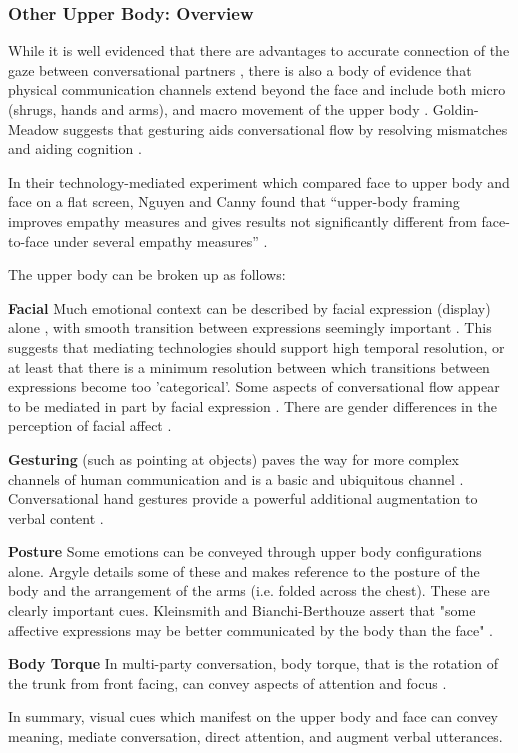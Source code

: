 \subsubsection{Other Upper Body: Overview}
While it is well evidenced that there are advantages to accurate connection of the gaze between conversational partners \cite{Argyle1969, Kleinke1986}, there is also a body of evidence that physical communication channels extend beyond the face \cite{Kleinke1986, Nguyen2009} and include both micro (shrugs, hands and arms), and macro movement of the upper body \cite{Ekman1993}. Goldin-Meadow suggests that gesturing aids conversational flow by resolving mismatches and aiding cognition \cite{Goldin-Meadow1999}.\par
                    In their technology-mediated experiment which compared face to upper body and face on a flat screen, Nguyen and Canny found that ``upper-body framing improves empathy measures and gives results not significantly different from face-to-face under several empathy measures'' \cite{Nguyen2009}. 
                    
The upper body can be broken up as follows:\par
\textbf{Facial} Much emotional context can be described by facial expression (display) alone \cite{Ekman1993, Chovil1991}, with smooth transition between expressions seemingly important \cite{schiano2004categorical}. This suggests that mediating technologies should support high temporal resolution, or at least that there is a minimum resolution between which transitions between expressions become too 'categorical'. Some aspects of conversational flow appear to be mediated in part by facial expression \cite{ohba1998facial}. There are gender differences in the perception of facial affect \cite{Hofmann20061683}.\par
\textbf{Gesturing} (such as pointing at objects) paves the way for more complex channels of human communication and is a basic and ubiquitous channel \cite{Iverson2005}.  Conversational hand gestures provide a powerful additional augmentation to verbal content \cite{Krauss1996}.\par
\textbf{Posture} Some emotions can be conveyed through upper body configurations alone. Argyle details some of these \cite{Argyle1988} and makes reference to the posture of the body and the arrangement of the arms (i.e. folded across the chest). These are clearly important cues. Kleinsmith and Bianchi-Berthouze assert that "some affective expressions may be better communicated by the body than the face" \cite{Kleinsmith2013}.\par
\textbf{Body Torque} In multi-party conversation, body torque, that is the rotation of the trunk from front facing, can convey aspects of attention and focus \cite{10.2307/40971262}.\par
In summary, visual cues which manifest on the upper body and face can convey meaning, mediate conversation, direct attention, and augment verbal utterances. \par
